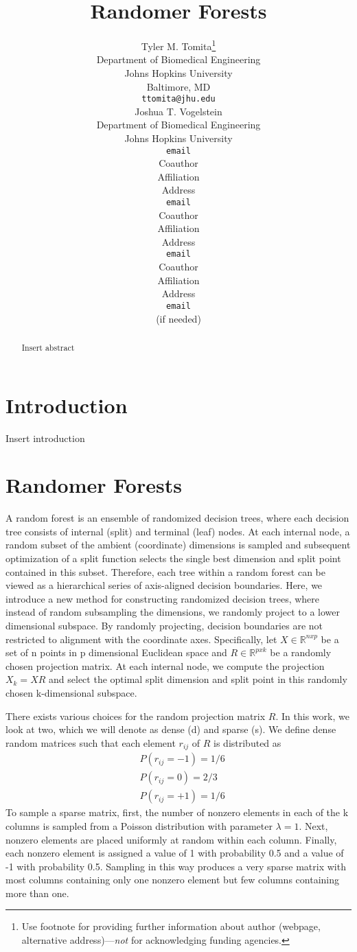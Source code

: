 \documentclass{article} %
\title{Randomer Forests}
\author{
Tyler M. Tomita\thanks{ Use footnote for providing further information
about author (webpage, alternative address)---\emph{not} for acknowledging
funding agencies.} \\
Department of Biomedical Engineering\\
Johns Hopkins University\\
Baltimore, MD \\
\texttt{ttomita@jhu.edu} \\
\And
Joshua T. Vogelstein \\
Department of Biomedical Engineering \\
Johns Hopkins University \\
\texttt{email} \\
\AND
Coauthor \\
Affiliation \\
Address \\
\texttt{email} \\
\And
Coauthor \\
Affiliation \\
Address \\
\texttt{email} \\
\And
Coauthor \\
Affiliation \\
Address \\
\texttt{email} \\
(if needed)\\
}
\begin{document}
\maketitle

\begin{abstract}
Insert abstract
\end{abstract}

\section{Introduction}
Insert introduction

\section{Randomer Forests}
A random forest is an ensemble of randomized decision trees, where each decision tree consists of internal (split) and terminal (leaf) nodes. At each internal node, a random subset of the ambient (coordinate) dimensions is sampled and subsequent optimization of a split function selects the single best dimension and split point contained in this subset. Therefore, each tree within a random forest can be viewed as a hierarchical series of axis-aligned decision boundaries. Here, we introduce a new method for constructing randomized decision trees, where instead of random subsampling the dimensions, we randomly project to a lower dimensional subspace. By randomly projecting, decision boundaries are not restricted to alignment with the coordinate axes. Specifically, let $X \in \mathbb{R}^{nxp}$ be a set of n points in p dimensional Euclidean space and $R \in \mathbb{R}^{pxk}$ be a randomly chosen projection matrix. At each internal node, we compute the projection $X_k = XR$ and select the optimal split dimension and split point in this randomly chosen k-dimensional subspace.

There exists various choices for the random projection matrix $R$. In this work, we look at two, which we will denote as dense (d) and sparse (s). We define dense random matrices such that each element $r_{ij}$  of $R$ is distributed as \begin{align*}
&P(r_{ij} = -1) = 1/6 \\
&P(r_{ij} = 0) = 2/3 \\
&P(r_{ij} = +1) = 1/6
\end{align*}
To sample a sparse matrix, first, the number of nonzero elements in each of the k columns is sampled from a Poisson distribution with parameter $\lambda = 1$. Next, nonzero elements are placed uniformly at random within each column. Finally, each nonzero element is assigned a value of 1 with probability 0.5 and a value of -1 with probability 0.5. Sampling in this way produces a very sparse matrix with most columns containing only one nonzero element but few columns containing more than one.
\end{document}
